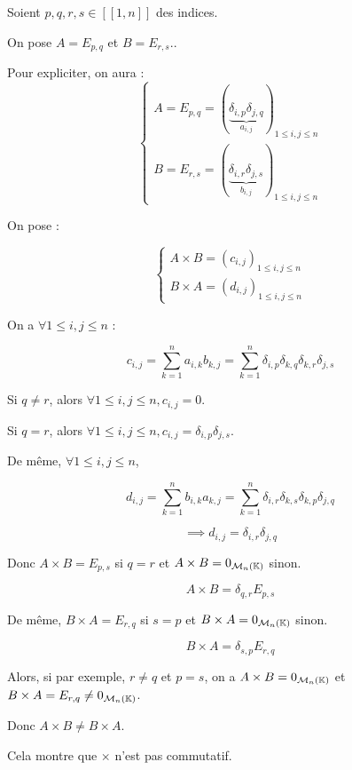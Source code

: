 \documentclass[12pt,a4paper]{report}
\begin{document}
\begin{property}
    Soient $p,q,r,s \in [\![1,n]\!]$ des indices.

    On pose $A = E_{p,q}$ et $B = E_{r,s}$..

    Pour expliciter, on aura :
    $$\begin{cases}
    A = E_{p,q} = (\underbrace{\delta_{i,p}\delta_{j,q}}_{a_{i,j}})_{1 \le i,j \le n}\\
    B = E_{r,s} = (\underbrace{\delta_{i,r}\delta_{j,s}}_{b_{i,j}})_{1 \le i,j \le n}
    \end{cases}$$

    On pose :
    
    $$\begin{cases}A\times B = (c_{i,j})_{1 \le i,j \le n}
    \\
    B\times A = (d_{i,j})_{1 \le i,j \le n}\end{cases}$$

    On a $\forall 1 \le i,j \le n$ :
    
    $$c_{i,j} = \sum_{k=1}^n a_{i,k} b_{k,j} = \sum_{k=1}^n \delta_{i,p}\delta_{k,q} \delta_{k,r}\delta_{j,s}$$
    
    Si $q \ne r$, alors $\forall 1 \le i,j \le n, c_{i,j} = 0$.

    Si $q = r$, alors $\forall 1 \le i,j \le n, c_{i,j} = \delta_{i,p}\delta_{j,s}$.

    De même, $\forall 1 \le i,j \le n$,
    
    $$d_{i,j} = \sum_{k=1}^n b_{i,k} a_{k,j} = \sum_{k=1}^n \delta_{i,r}\delta_{k,s} \delta_{k,p}\delta_{j,q}$$
    
    $$\implies \boxed{d_{i,j} = \delta_{i,r}\delta_{j,q}}$$

    Donc $A\times B = E_{p,s}$ si $q=r$ et $A\times B = 0_{\mathcal M_n(\mathbb{K})}$ sinon.

    $$A\times B = \delta_{q,r} E_{p,s}$$

    De même, $B\times A = E_{r,q}$ si $s=p$ et $B\times A = 0_{\mathcal M_n(\mathbb{K})}$ sinon.

    $$B\times A = \delta_{s,p} E_{r,q}$$

    Alors, si par exemple, $r \ne q$ et $p=s$, on a $A\times B = 0_{\mathcal M_n(\mathbb{K})}$ et $B\times A = E_{r,q} \ne 0_{\mathcal M_n(\mathbb{K})}$.

    Donc $A\times B \ne B\times A$.

    Cela montre que $\times$ n'est pas commutatif.
\end{property}
\end{document}
